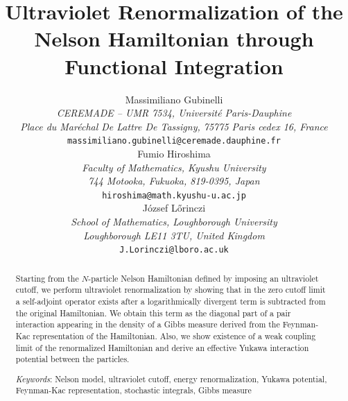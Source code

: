 \documentclass[12pt]{article}
\date{}
\providecommand{\1}{\mathbb{1}}
\begin{document}
\title
{{ Ultraviolet Renormalization of the Nelson Hamiltonian through
Functional Integration}}
\author{
\small Massimiliano Gubinelli\\[0.1cm]
 {\small\it    CEREMADE -- UMR 7534, Universit\'e Paris-Dauphine }    \\[-0.7ex]
  {\small\it  Place du Mar\'echal De Lattre De Tassigny,
75775 Paris cedex 16, France}      \\[-0.7ex]
 {\small  {\tt massimiliano.gubinelli@ceremade.dauphine.fr}   }\\[0.5cm]
\small Fumio Hiroshima\\
{\small\it Faculty of Mathematics, Kyushu University}    \\[-0.7ex]
{\small\it 744 Motooka, Fukuoka, 819-0395, Japan}      \\[-0.7ex]
{\small  {\tt hiroshima@math.kyushu-u.ac.jp}}\\[0.5cm]
\small J\'ozsef L\H{o}rinczi\\[0.1cm]
{\it \small School of Mathematics, Loughborough University} \\[-0.7ex]
{\it \small Loughborough LE11 3TU, United Kingdom} \\[-0.7ex]
{\small {\tt  J.Lorinczi@lboro.ac.uk}} \\[-0.7ex]}
\maketitle


\bigskip
\begin{abstract}
\noindent
Starting from the $N$-particle Nelson Hamiltonian defined by imposing an ultraviolet cutoff,
we perform ultraviolet %
renormalization by showing that in the zero cutoff limit a
self-adjoint operator exists after a logarithmically divergent term is subtracted from
the original Hamiltonian. We obtain this term as the diagonal part of a pair interaction
appearing in the density of a Gibbs measure derived from the Feynman-Kac representation
of the Hamiltonian. Also, we show existence of a weak coupling limit of the renormalized
Hamiltonian and derive an effective Yukawa interaction potential between the particles.

\bigskip
\noindent
\emph{Keywords}: Nelson model, ultraviolet cutoff, energy renormalization,
Yukawa potential, Feynman-Kac representation, stochastic integrals, Gibbs measure
\end{abstract}
\end{document}
